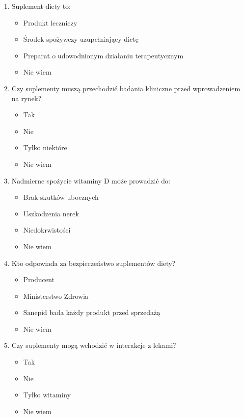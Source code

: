 \begin{appendices}
\begin{enumerate}
    \item Suplement diety to:
    \begin{itemize}
        \item Produkt leczniczy
        \item Środek spożywczy uzupełniający dietę
        \item Preparat o udowodnionym działaniu terapeutycznym
        \item Nie wiem
    \end{itemize}

    \item Czy suplementy muszą przechodzić badania kliniczne przed wprowadzeniem na rynek?
    \begin{itemize}
        \item Tak
        \item Nie
        \item Tylko niektóre
        \item Nie wiem
    \end{itemize}

    \item Nadmierne spożycie witaminy D może prowadzić do:
    \begin{itemize}
        \item Brak skutków ubocznych
        \item Uszkodzenia nerek
        \item Niedokrwistości
        \item Nie wiem
    \end{itemize}

    \item Kto odpowiada za bezpieczeństwo suplementów diety?
    \begin{itemize}
        \item Producent
        \item Ministerstwo Zdrowia
        \item Sanepid bada każdy produkt przed sprzedażą
        \item Nie wiem
    \end{itemize}

    \item Czy suplementy mogą wchodzić w interakcje z lekami?
    \begin{itemize}
        \item Tak
        \item Nie
        \item Tylko witaminy
        \item Nie wiem
    \end{itemize}


\end{enumerate}
\end{appendices}
